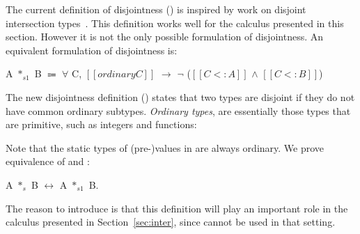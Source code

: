 The current definition of disjointness () is inspired
by work on disjoint intersection types~\cite{oliveira2016disjoint}. This definition works well
for the calculus presented in this section. However it is not the only
possible formulation of disjointness.
An equivalent formulation of disjointness is:

\begin{definition}
    A $*_{s1}$ B $\Coloneqq$ $\forall$ C, $[[ordinary C]]$ $\rightarrow$ $\neg$ ($[[C <: A]]$ $\wedge$ $[[C <: B]]$)
    \label{def:union:disj1}
  \end{definition}

\noindent
The new disjointness definition () states that two
types are disjoint if they do not have common ordinary subtypes.
\emph{Ordinary types}, are essentially
those types that are primitive, such as integers and functions:

\medskip

\noindent Note that the static types of (pre-)values in \name are always ordinary.
We prove equivalence of  and
:

\begin{lemma}
A $*_{s}$ B $\longleftrightarrow$ A $*_{s1}$ B.
\end{lemma}

The reason to introduce  is that this definition
will play an important role in the calculus presented in Section~\ref{sec:inter},
since  cannot be used in that setting.
